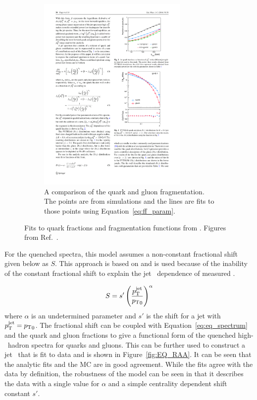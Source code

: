 \begin{figure}
\begin{subfigure}{.45\textwidth}
\includegraphics[width=0.8\textwidth]{figures/jetMeasurements/gluon_fragmentation}
\caption{A comparison of the quark and gluon fragmentation.
The points are from  simulations and the lines are fits to those points using Equation~\ref{eq:ff_param}.}
\label{fig:gluon_fragmentation}
\end{subfigure}
\caption{Fits to quark fractions and fragmentation functions from .
 Figures from Ref.~\cite{Spousta:2015fca}.}
\label{fig:EQ_pp_models}
\end{figure}

For the quenched spectra, this model assumes a non-constant fractional shift given below as $S$.
This approach is based on \cite{baier2001quenching} and is used because of the inability of the constant fractional shift to explain the jet \pt\ dependence of measured \RAA.

\begin{align}
S = s' \left( \frac{\mbox{$p_{\mathrm{T}}^{\mathrm{jet}}$}}{\mbox{$p_{\mathrm{T}}$}_0} \right) ^\alpha
\end{align}
where $\alpha$ is an undetermined parameter and $s'$ is the shift for a jet with $\mbox{$p_{\mathrm{T}}^{\mathrm{jet}}$} = \mbox{$p_{\mathrm{T}}$}_0$.
The fractional shift can be coupled with Equation~\ref{eq:eq_spectrum} and the quark and gluon fractions to give a functional form of the quenched high-\pt\ hadron spectra for quarks and gluons.
This can be further used to construct a jet \RAA\ that is fit to data and is shown in Figure~\ref{fig:EQ_RAA}.
It can be seen that the analytic fits and the MC are in good agreement.
While the fits agree with the data by definition, the robustness of the model can be seen in that it describes the data with a single value for $\alpha$ and a simple centrality dependent shift constant $s'$.


